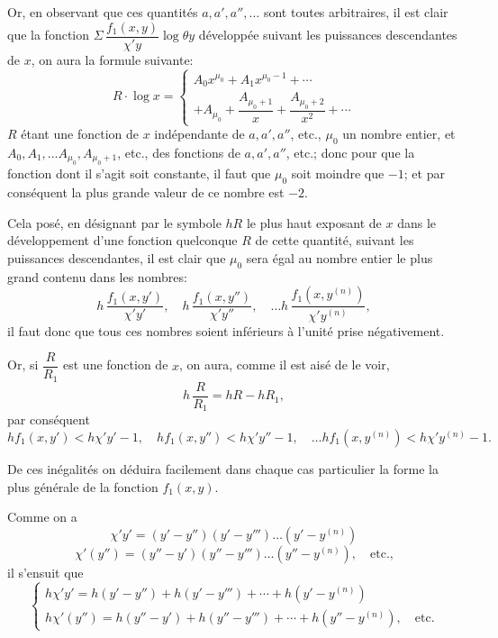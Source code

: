 \documentclass{article}
\begin{document}
Or, en observant que ces quantités $a, a', a'', \ldots$ sont toutes arbitraires, il est clair que la fonction $\Sigma\,\dfrac{f_1(x, y)}{\chi' y}\log\theta y$ développée suivant les puissances descendantes de $x$, on aura la formule suivante:
\[ R \cdot \log x = \begin{cases} A_0 x^{\mu_0} + A_1 x^{\mu_0-1} + \cdots \\ + A_{\mu_0} + \dfrac{A_{\mu_0+1}}{x} + \dfrac{A_{\mu_0+2}}{x^{2}} + \cdots \end{cases} \]
$R$ étant une fonction de $x$ indépendante de $a, a', a''$, etc., $\mu_0$ un nombre entier, et $A_0, A_1, \ldots A_{\mu_0}, A_{\mu_0+1}$, etc., des fonctions de $a, a', a''$, etc.; donc pour que la fonction dont il s'agit soit constante, il faut que $\mu_0$ soit moindre que $-1$; et par conséquent la plus grande valeur de ce nombre est $-2$.

Cela posé, en désignant par le symbole $hR$ le plus haut exposant de $x$ dans le développement d'une fonction quelconque $R$ de cette quantité, suivant les puissances descendantes, il est clair que $\mu_0$ sera égal au nombre entier le plus grand contenu dans les nombres:
\[ h\,\frac{f_1(x, y')}{\chi' y'}, \quad h\,\frac{f_1(x, y'')}{\chi' y''}, \quad \ldots h\,\frac{f_1(x, y^{(n)})}{\chi' y^{(n)}}, \]
il faut donc que tous ces nombres soient inférieurs à l'unité prise négativement.

Or, si $\dfrac{R}{R_1}$ est une fonction de $x$, on aura, comme il est aisé de le voir,
\[ h\,\frac{R}{R_1} = hR - hR_1, \]
par conséquent
\[ hf_1(x, y') < h\chi' y' - 1, \quad hf_1(x, y'') < h\chi' y'' - 1, \quad \ldots hf_1(x, y^{(n)}) < h\chi' y^{(n)} - 1. \tag{47} \]

De ces inégalités on déduira facilement dans chaque cas particulier la forme la plus générale de la fonction $f_1(x, y)$.

Comme on a
\[ \chi' y' = (y'-y'')(y'-y''') \ldots (y'-y^{(n)}) \]
\[ \chi'(y'') = (y''-y')(y''-y''') \ldots (y''-y^{(n)}), \quad \text{etc.,} \]
il s'ensuit que
\[ \begin{cases} h\chi' y' = h(y'-y'') + h(y'-y''') + \cdots + h(y'-y^{(n)}) \\ h\chi'(y'') = h(y''-y') + h(y''-y''') + \cdots + h(y''-y^{(n)}), \quad \text{etc.} \end{cases} \tag{48} \]
\end{document}
